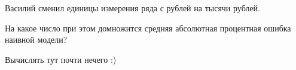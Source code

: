 
\begin{question}
Василий сменил единицы измерения ряда с рублей на тысячи рублей.

На какое число при этом домножится средняя абсолютная процентная ошибка наивной модели?
\end{question}

\begin{solution}
Вычислять тут почти нечего :)
\end{solution}

